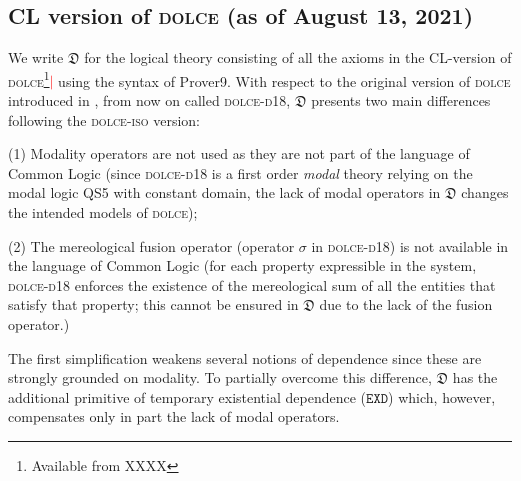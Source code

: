 \documentclass[ao]{iosart2x}
\newcommand{\nb}[1]{\textcolor{red}{$|$}\marginpar{\hspace*{-0cm}\parbox{20mm}{\scriptsize\raggedright\textcolor{red}{#1}}}}
\newcommand{\bflist}{\begin{list}{}{\setlength{\topsep}{2mm}\setlength{\parsep}{0mm}\setlength{\leftmargin}{9.2mm}\setlength{\labelwidth}{8mm}}}
\newcommand{\eflist}{\end{list}}
\newcommand{\dolceDefLabel}{\textrm{d$_\texttt{d}$}}
\newcommand{\refdolcedf}[1]{({\dolceDefLabel}\ref{#1})}
\newcommand{\pr}[1]{\mathtt{#1}}
\newcommand{\dolce}{{\textsc{dolce}}}
\newcommand{\dolceorig}{{\textsc{dolce-d{\footnotesize 18}}}}
\newcommand {\thdolce} {\ensuremath{\mathfrak{D}}}
\newcommand {\SDd} {\ensuremath{\pr{SD}}}
\newcommand {\EXDd} {\ensuremath{\pr{EXD}}}
\begin{document}
\subsection{CL version of {\dolce} (as of August 13, 2021) }\label{sect_dolce}

%
%
%
We write $\thdolce$ for the logical theory consisting of all the axioms in the CL-version of {\dolce}\footnote{Available from {\color{red} XXXX}}\nb{add sito web in footnote} using the syntax of Prover9. With respect to the original version of {\dolce} introduced in \cite{D18}, from now on called {\dolceorig},
$\thdolce$ presents two main differences following the {\dolce-\textsc{iso}} version:
\bflist
\item[(1)] Modality operators are not used as they are not part of the language of Common Logic (since {\dolceorig} is a first order {\em modal} theory relying on the modal logic QS5 with constant domain, the lack of modal operators in $\thdolce$ changes the intended models of {\dolce}); 
\item[(2)] The mereological fusion operator (operator $\sigma$ in {\dolceorig}) is not available in the language of Common Logic (for each property expressible in the system, {\dolceorig} enforces the existence of the mereological sum of all the entities that satisfy that property; this cannot be ensured in $\thdolce$ due to the lack of the fusion operator.)
\eflist

The first simplification weakens several notions of dependence since these are strongly grounded on modality. To partially overcome this difference, $\thdolce$ has the additional primitive of temporary existential dependence ($\EXDd$) which, however, compensates only in part the lack of modal operators. %
\end{document}
